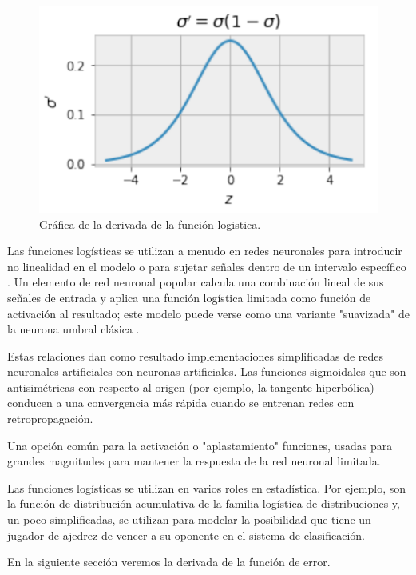 \begin{figure}[H]
 \centering
 \includegraphics[scale=0.5]{../Figuras/devLog.png}
 \caption{Gráfica de la derivada de la función logistica.}
 \label{fig:graficaLogDev}
\end{figure}

Las funciones logísticas se utilizan a menudo en redes neuronales para introducir no linealidad en el modelo o para sujetar señales dentro de un intervalo específico . Un elemento de red neuronal popular calcula una combinación lineal de sus señales de entrada y aplica una función logística limitada como función de activación al resultado; este modelo puede verse como una variante "suavizada" de la neurona umbral clásica .

Estas relaciones dan como resultado implementaciones simplificadas de redes neuronales artificiales con neuronas artificiales. Las funciones sigmoidales que son antisimétricas con respecto al origen (por ejemplo, la tangente hiperbólica) conducen a una convergencia más rápida cuando se entrenan redes con retropropagación.

Una opción común para la activación o "aplastamiento" funciones, usadas para grandes magnitudes para mantener la respuesta de la red neuronal limitada. 

Las funciones logísticas se utilizan en varios roles en estadística. Por ejemplo, son la función de distribución acumulativa de la familia logística de distribuciones y, un poco simplificadas, se utilizan para modelar la posibilidad que tiene un jugador de ajedrez de vencer a su oponente en el sistema de clasificación.

En la siguiente sección veremos la derivada de la función de error.

